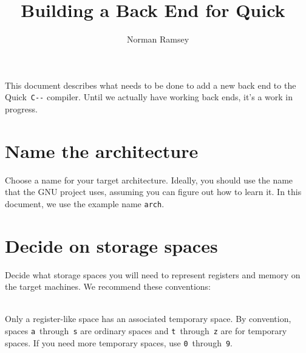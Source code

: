 \documentclass[12pt]{article}
\title{Building a Back End for Quick~{\PAL} \addtherevision}
\author{Norman Ramsey}
\newcommand\PAL{\texttt{C-{}-}}
\begin{document}
\maketitle
\tableofcontents

This document describes what needs to be done to add a new back end to
the Quick~{\PAL} compiler.
Until we actually have working back ends, it's a work in progress.

\section{Name the architecture}

Choose a name for your target architecture.
Ideally, you should use the name that the GNU project uses, assuming
you can figure out how to learn it.
In this document, we use the example name \texttt{arch}.

\section{Decide on storage spaces}

\newcommand\inspace[2]{\ensuremath{\$\mathtt{#1}[#2]}}

Decide what storage spaces you will need to represent registers and
memory on the target machines.
We recommend these conventions:\\[3pt]
\\[3pt]
Only a register-like space has an associated temporary
space.
By convention, spaces \texttt{a}~through~\texttt{s} are ordinary
spaces and \texttt{t}~through~\texttt{z} are for temporary spaces.
If you need more temporary spaces, use \texttt{0}~through~\texttt{9}.
\end{document}
